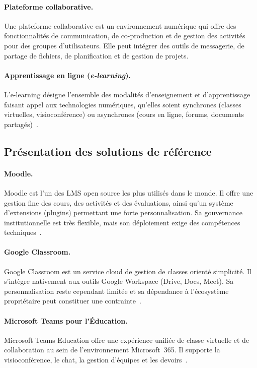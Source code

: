 \documentclass[12pt,a4paper,oneside]{report}
\begin{document}
\paragraph{Plateforme collaborative.}
Une plateforme collaborative est un environnement num\'erique qui offre des fonctionnalit\'es de communication, de co-production et de gestion des activit\'es pour des groupes d'utilisateurs. Elle peut int\'egrer des outils de messagerie, de partage de fichiers, de planification et de gestion de projets.

\paragraph{Apprentissage en ligne (\textit{e-learning}).}
L'e-learning d\'esigne l'ensemble des modalit\'es d'enseignement et d'apprentissage faisant appel aux technologies num\'eriques, qu'elles soient synchrones (classes virtuelles, visioconf\'erence) ou asynchrones (cours en ligne, forums, documents partag\'es)~\cite{unesco_digital_2026}.

\subsection{Pr\'esentation des solutions de r\'ef\'erence}

\paragraph{Moodle.}
Moodle est l'un des LMS open source les plus utilis\'es dans le monde. Il offre une gestion fine des cours, des activit\'es et des \'évaluations, ainsi qu'un syst\`eme d'extensions (plugins) permettant une forte personnalisation. Sa gouvernance institutionnelle est tr\`es flexible, mais son d\'eploiement exige des comp\'etences techniques~\cite{moodle_overview_2026}.

\paragraph{Google Classroom.}
Google Classroom est un service cloud de gestion de classes orient\'e simplicit\'e. Il s'int\`egre nativement aux outils Google Workspace (Drive, Docs, Meet). Sa personnalisation reste cependant limit\'ee et sa d\'ependance \`a l'\'ecosyst\`eme propri\'etaire peut constituer une contrainte~\cite{google_classroom_2026}.

\paragraph{Microsoft Teams pour l'\'Education.}
Microsoft Teams Education offre une exp\'erience unifi\'ee de classe virtuelle et de collaboration au sein de l'environnement Microsoft~365. Il supporte la visioconf\'erence, le chat, la gestion d'\'équipes et les devoirs~\cite{microsoft_teams_edu_2026}.
\end{document}
